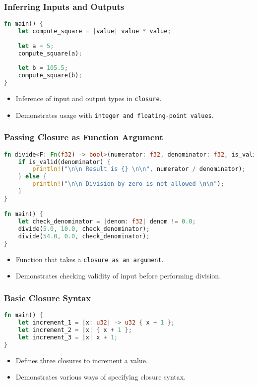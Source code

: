 \documentclass[aspectratio=169, table]{beamer}
\begin{document}
\begin{frame}[fragile]
\frametitle{Inferring Inputs and Outputs}
\begin{lstlisting}[language=Rust]
fn main() {
	let compute_square = |value| value * value;
	
	let a = 5;
	compute_square(a);
	
	let b = 105.5;
	compute_square(b);
}
\end{lstlisting}
\begin{itemize}
\item Inference of input and output types in \texttt{closure}.
\item Demonstrates usage with \texttt{integer\ and\ floating-point\ values}.
\end{itemize}
\end{frame}

\begin{frame}[fragile]
\frametitle{Passing Closure as Function Argument}
\begin{lstlisting}[language=Rust]
fn divide<F: Fn(f32) -> bool>(numerator: f32, denominator: f32, is_valid: F) {
	if is_valid(denominator) {
		println!("\n\n Result is {} \n\n", numerator / denominator);
	} else {
		println!("\n\n Division by zero is not allowed \n\n");
	}
}

fn main() {
	let check_denominator = |denom: f32| denom != 0.0;
	divide(5.0, 10.0, check_denominator);
	divide(54.0, 0.0, check_denominator);
}
\end{lstlisting}
\begin{itemize}
\item Function that takes a \texttt{closure\ as\ an\ argument}.
\item Demonstrates checking validity of input before performing division.
\end{itemize}
\end{frame}


\begin{frame}[fragile]
\frametitle{Basic Closure Syntax}
\begin{lstlisting}[language=Rust]
fn main() {
	let increment_1 = |x: u32| -> u32 { x + 1 };
	let increment_2 = |x| { x + 1 };
	let increment_3 = |x| x + 1;
}
\end{lstlisting}
\begin{itemize}
\item Defines three closures to increment a value.
\item Demonstrates various ways of specifying closure syntax.
\end{itemize}
\end{frame}
\end{document}
